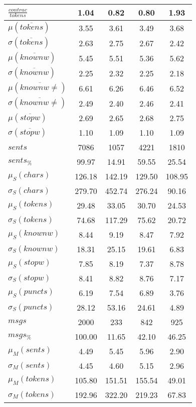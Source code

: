\begin{table}[h!]
\begin{center}
\begin{tabular}{| l || c | c | c | c |}
$\frac{contrac}{tokens}$ & 1.04  & 0.82  & 0.80  & 1.93 \\\hline\hline
$\mu(\overline{tokens})$ & 3.55  & 3.61  & 3.49  & 3.68 \\
$\sigma(\overline{tokens})$ & 2.63  & 2.75  & 2.67  & 2.42 \\\hline
$\mu(\overline{knownw})$ & 5.45  & 5.51  & 5.36  & 5.62 \\
$\sigma(\overline{knownw})$ & 2.25  & 2.32  & 2.25  & 2.18 \\\hline
$\mu(\overline{knownw \neq})$ & 6.61  & 6.26  & 6.46  & 6.52 \\
$\sigma(\overline{knownw \neq})$ & 2.49  & 2.40  & 2.46  & 2.41 \\\hline
$\mu(\overline{stopw})$ & 2.69  & 2.65  & 2.68  & 2.75 \\
$\sigma(\overline{stopw})$ & 1.10  & 1.09  & 1.10  & 1.09 \\\hline\hline
$sents$ & 7086  & 1057  & 4221  & 1810 \\
$sents_{\%}$ & 99.97  & 14.91  & 59.55  & 25.54 \\\hline
$\mu_S(chars)$ & 126.18  & 142.19  & 129.50  & 108.95 \\
$\sigma_S(chars)$ & 279.70  & 452.74  & 276.24  & 90.16 \\\hline
$\mu_S(tokens)$ & 29.48  & 33.05  & 30.70  & 24.53 \\
$\sigma_S(tokens)$ & 74.68  & 117.29  & 75.62  & 20.72 \\\hline
$\mu_S(knownw)$ & 8.44  & 9.19  & 8.47  & 7.92 \\
$\sigma_S(knownw)$ & 18.31  & 25.15  & 19.61  & 6.83 \\\hline
$\mu_S(stopw)$ & 7.85  & 8.19  & 7.37  & 8.78 \\
$\sigma_S(stopw)$ & 8.41  & 8.82  & 8.76  & 7.17 \\\hline
$\mu_S(puncts)$ & 6.19  & 7.54  & 6.89  & 3.76 \\
$\sigma_S(puncts)$ & 28.12  & 53.16  & 24.61  & 4.89 \\\hline\hline
$msgs$ & 2000  & 233  & 842  & 925 \\
$msgs_{\%}$ & 100.00  & 11.65  & 42.10  & 46.25 \\\hline
$\mu_M(sents)$ & 4.49  & 5.45  & 5.96  & 2.90 \\
$\sigma_M(sents)$ & 4.45  & 4.60  & 5.15  & 2.96 \\\hline
$\mu_M(tokens)$ & 105.80  & 151.51  & 155.54  & 49.01 \\
$\sigma_M(tokens)$ & 192.96  & 322.20  & 219.23  & 67.83 \\\hline

\end{tabular}
\end{center}
\end{table}
